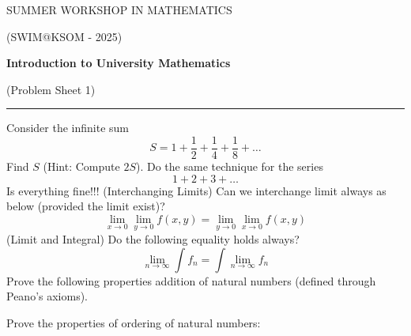 \documentclass[fleqn]{exam}
\begin{document}
\begin{center}
	{\huge SUMMER WORKSHOP IN MATHEMATICS}
	
	\bigskip
	
	{\large (SWIM@KSOM - 2025)}
	
	\bigskip


	\textbf{\Large Introduction to University Mathematics}
	
	\medskip

	{\large (Problem Sheet 1)}

	\medskip
	
	\hrule
\end{center}

\begin{questions}
	\question Consider the infinite sum 
	\[S=1+\frac{1}{2}+\frac{1}{4}+\frac{1}{8}+\ldots\]
	Find $S$ (Hint: Compute $2S$). Do the same technique for the series
	\[1+2+3+\ldots\]
	Is everything fine!!!
	\question (Interchanging Limits) Can we interchange limit always as below (provided the limit exist)?
	\[\lim_{x\to 0}\lim_{y\to0}f(x,y)=\lim_{y\to 0}\lim_{x\to0}f(x,y)\]
	\question (Limit and Integral) Do the following equality holds always?
	\[\lim_{n\to\infty}\int f_n=\int\lim_{n\to\infty}f_n\]
	\question Prove the following properties addition of natural numbers (defined through Peano's axioms).
	\question Prove the properties of ordering of natural numbers:
\end{questions}
\end{document}
